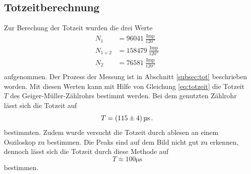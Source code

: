 \subsection{Totzeitberechnung}
Zur Berechung der Totzeit wurden die drei Werte
\begin{align*}
  N_1 &= \SI{96041}{\frac{\text{Imp}}{120\second}} \\
  N_{1+2} &= \SI{158479}{\frac{\text{Imp}}{120\second}} \\
  N_2 &= \SI{76581}{\frac{\text{Imp}}{120\second}} \\
  \label{eq:tot}
\end{align*}
aufgenommen.
Der Prozess der Messung ist in Abschnitt \ref{subsec:tot} beschrieben worden.
Mit diesen Werten kann mit Hilfe von Gleichung \eqref{eq:totzeit} die Totzeit $T$ des Geiger-Müller-Zählrohrs bestimmt werden.
Bei dem genutzten Zählrohr lässt sich die Totzeit auf 
\begin{equation*}
    T = \SI{115+-4}{\micro\second} \, .
\end{equation*}
bestimmten.
Zudem wurde versucht die Totzeit durch ablesen an einem Osziloskop zu bestimmen.
Die Peaks sind auf dem Bild nicht gut zu erkennen, dennoch lässt sich die Totzeit durch diese Methode auf
\begin{equation*}
  T \approx 100 \si{\micro\second}
\end{equation*}
bestimmen.
\FloatBarrier

